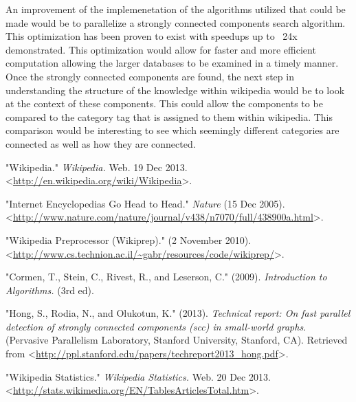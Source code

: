 \documentclass[twoside]{article}
\begin{document}
\begin{multicols}{2}
 An improvement of the implemenetation of the algorithms utilized 
that could be made would be to parallelize a strongly connected components search algorithm. 
This optimization has been proven to exist with speedups up to ~24x demonstrated. \cite{Parallel} 
This optimization would allow for faster and more efficient computation allowing 
the larger databases to be examined in a timely manner.\\

Once the strongly connected components are found, the next step in understanding the 
structure of the knowledge within wikipedia would be to look at the context of these components.
This could allow the components to be compared to the category tag that is assigned to them
within wikipedia. This comparison would be interesting to see which seemingly different
categories are connected as well as how they are connected.\\


\end{multicols}




\begin{thebibliography}{99} %

 "Wikipedia." {\em Wikipedia.}
		Web. 19 Dec 2013. <\url{http://en.wikipedia.org/wiki/Wikipedia}>.
	
 "Internet Encyclopedias Go Head to Head." {\em Nature}
		(15 Dec 2005). <\url{http://www.nature.com/nature/journal/v438/n7070/full/438900a.html}>.

 "Wikipedia Preprocessor (Wikiprep)."
	(2 November 2010). <\url{http://www.cs.technion.ac.il/~gabr/resources/code/wikiprep/}>.

 "Cormen, T., Stein, C., Rivest, R., and Leserson, C." (2009).
	 {\em Introduction to Algorithms.} (3rd ed).
	
 "Hong, S., Rodia, N., and Olukotun, K." (2013).
	{\em Technical report: On fast parallel detection of strongly connected components (scc) in small-world graphs}.
	(Pervasive Parallelism Laboratory, Stanford University, Stanford, CA).
	Retrieved from <\url{http://ppl.stanford.edu/papers/techreport2013_hong.pdf}>.
	
 "Wikipedia Statistics." {\em Wikipedia Statistics.}
		Web. 20 Dec 2013. <\url{http://stats.wikimedia.org/EN/TablesArticlesTotal.htm}>.



\end{thebibliography}

\end{document}

